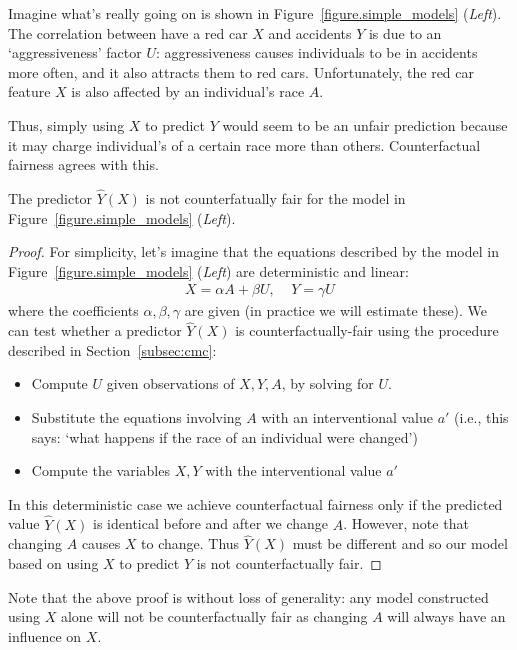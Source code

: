 Imagine what's really going on is shown in Figure~\ref{figure.simple_models} (\emph{Left}). The correlation between have a red car $X$ and accidents $Y$ is due to an `aggressiveness' factor $U$: aggressiveness causes individuals to be in accidents more often, and it also attracts them to red cars. Unfortunately, the red car feature $X$ is also affected by an individual's race $A$. 

Thus, simply using $X$ to predict $Y$ would seem to be an unfair prediction because it may charge individual's of a certain race more than others. Counterfactual fairness agrees with this. 

\begin{lem}
The predictor $\hat{Y}(X)$ is not counterfatually fair for the model in Figure~\ref{figure.simple_models} (\emph{Left}).
\end{lem}

\begin{proof}
For simplicity, let's imagine that the equations described by the model in Figure~\ref{figure.simple_models} (\emph{Left}) are deterministic and linear:
\begin{align}
X = \alpha A + \beta U, \;\;\;\; Y = \gamma U \nonumber
\end{align}
where the coefficients $\alpha,\beta,\gamma$ are given (in practice we will estimate these). We can test whether a predictor $\hat{Y}(X)$ is counterfactually-fair using the procedure described in Section~\ref{subsec:cmc}:
\begin{itemize}
\item Compute $U$ given observations of $X,Y,A$, by solving for $U$.
\item Substitute the equations involving $A$ with an interventional value $a'$ (i.e., this says: `what happens if the race of an individual were changed')
\item Compute the variables $X,Y$ with the interventional value $a'$
\end{itemize}
In this deterministic case we achieve counterfactual fairness only if the predicted value $\hat{Y}(X)$ is identical before and after we change $A$. However, note that changing $A$ causes $X$ to change. Thus $\hat{Y}(X)$ must be different and so our model based on using $X$ to predict $Y$ is not counterfactually fair.
\end{proof}
Note that the above proof is without loss of generality: any model constructed using $X$ alone will not be counterfactually fair as changing $A$ will always have an influence on $X$.


